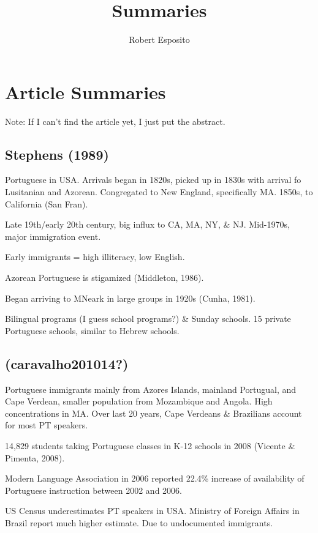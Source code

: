 \documentclass[
  letterpaper,
  DIV=11,
  numbers=noendperiod]{scrartcl}
\title{Summaries}
\author{Robert Esposito}
\date{}
\begin{document}
\maketitle


\section{Article Summaries}\label{article-summaries}

Note: If I can't find the article yet, I just put the abstract.

\subsection{Stephens (1989)}\label{stephens1989language}

Portuguese in USA. Arrivals began in 1820s, picked up in 1830s with
arrival fo Lusitanian and Azorean. Congregated to New England,
specifically MA. 1850s, to California (San Fran).

Late 19th/early 20th century, big influx to CA, MA, NY, \& NJ.
Mid-1970s, major immigration event.

Early immigrants = high illiteracy, low English.

Azorean Portuguese is stigamized (Middleton, 1986).

Began arriving to MNeark in large groups in 1920s (Cunha, 1981).

Bilingual programs (I guess school programs?) \& Sunday schools. 15
private Portuguese schools, similar to Hebrew schools.

\subsection{\texorpdfstring{(\textbf{caravalho201014?})}{(caravalho201014?)}}\label{caravalho201014}

Portuguese immigrants mainly from Azores Islands, mainland Portugual,
and Cape Verdean, smaller population from Mozambique and Angola. High
concentrations in MA. Over last 20 years, Cape Verdeans \& Brazilians
account for most PT speakers.

14,829 students taking Portuguese classes in K-12 schools in 2008
(Vicente \& Pimenta, 2008).

Modern Language Association in 2006 reported 22.4\% increase of
availability of Portuguese instruction between 2002 and 2006.

US Census underestimates PT speakers in USA. Ministry of Foreign Affairs
in Brazil report much higher estimate. Due to undocumented immigrants.
\end{document}
